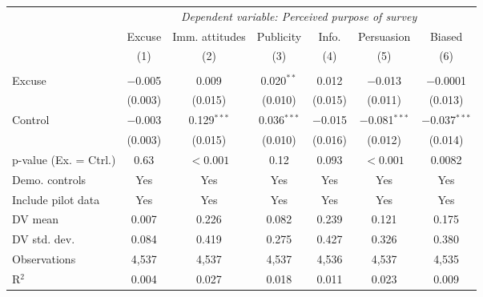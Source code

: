 
\begin{table}[!htbp] \centering 
  \label{t:2-purpose} 
\begin{threeparttable}
\begin{tabular}{@{\hspace{5pt}}l@{\hspace{5pt}}cccccc} 
\toprule 
 & \multicolumn{6}{c}{\textit{Dependent variable: Perceived purpose of survey}} \\ 
\cmidrule(rr){2-7} 
 & Excuse & Imm. attitudes & Publicity & Info. & Persuasion & Biased \\ 
 & (1) & (2) & (3) & (4) & (5) & (6)\\ 
\midrule  
\\[-2.1ex] Excuse & $-$0.005 & 0.009 & 0.020$^{**}$ & 0.012 & $-$0.013 & $-$0.0001 \\ 
  & (0.003) & (0.015) & (0.010) & (0.015) & (0.011) & (0.013) \\ 
 \addlinespace 
 Control & $-$0.003 & 0.129$^{***}$ & 0.036$^{***}$ & $-$0.015 & $-$0.081$^{***}$ & $-$0.037$^{***}$ \\ 
  & (0.003) & (0.015) & (0.010) & (0.016) & (0.012) & (0.014) \\ 
 \addlinespace 
p-value (Ex. = Ctrl.) & 0.63 & $<0.001$ & 0.12 & 0.093 & $<0.001$ & 0.0082 \\ 
\midrule  
Demo. controls & Yes & Yes & Yes & Yes & Yes & Yes \\ 
Include pilot data & Yes & Yes & Yes & Yes & Yes & Yes \\
\addlinespace
DV mean & 0.007 & 0.226 & 0.082 & 0.239 & 0.121 & 0.175 \\
DV std. dev. & 0.084 & 0.419 & 0.275 & 0.427 & 0.326 & 0.380 \\
Observations & 4,537 & 4,537 & 4,537 & 4,536 & 4,537 & 4,535 \\ 
R$^{2}$ & 0.004 & 0.027 & 0.018 & 0.011 & 0.023 & 0.009 \\ 
\bottomrule 
\end{tabular} 
\end{threeparttable}
\end{table} 
